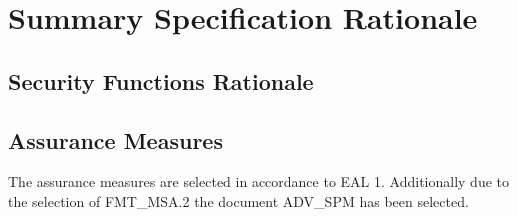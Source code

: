 \documentclass[12pt,english]{scrbook}
\begin{document}
\section{Summary Specification Rationale}

\subsection{Security Functions Rationale}



\subsection{Assurance Measures}

The assurance measures are selected in accordance to EAL 1. Additionally due to
the selection of FMT\_MSA.2 the document ADV\_SPM has been selected.
\end{document}
